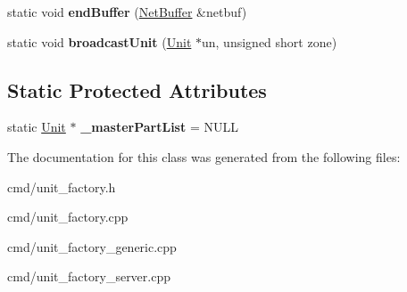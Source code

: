 \begin{DoxyCompactItemize}
\item 
static void {\bfseries end\+Buffer} (\hyperlink{classNetBuffer}{Net\+Buffer} \&netbuf)\hypertarget{classUnitFactory_a8f36d0fdf6f11e63c33c53cc4b29a4c2}{}\label{classUnitFactory_a8f36d0fdf6f11e63c33c53cc4b29a4c2}

\item 
static void {\bfseries broadcast\+Unit} (\hyperlink{classUnit}{Unit} $\ast$un, unsigned short zone)\hypertarget{classUnitFactory_a61245840e01d503a14f556edb88f52b3}{}\label{classUnitFactory_a61245840e01d503a14f556edb88f52b3}

\end{DoxyCompactItemize}
\subsection*{Static Protected Attributes}
\begin{DoxyCompactItemize}
\item 
static \hyperlink{classUnit}{Unit} $\ast$ {\bfseries \+\_\+master\+Part\+List} = N\+U\+LL\hypertarget{classUnitFactory_a4eb3456f731bf0db77aef6c7d831c18e}{}\label{classUnitFactory_a4eb3456f731bf0db77aef6c7d831c18e}

\end{DoxyCompactItemize}


The documentation for this class was generated from the following files\+:\begin{DoxyCompactItemize}
\item 
cmd/unit\+\_\+factory.\+h\item 
cmd/unit\+\_\+factory.\+cpp\item 
cmd/unit\+\_\+factory\+\_\+generic.\+cpp\item 
cmd/unit\+\_\+factory\+\_\+server.\+cpp\end{DoxyCompactItemize}

